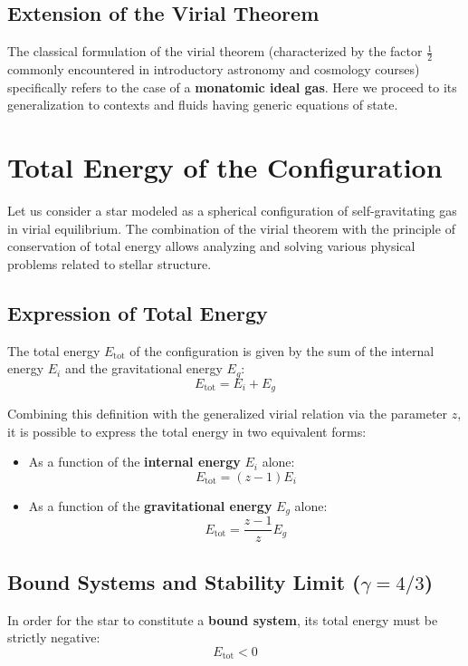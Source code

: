 \subsection{Extension of the Virial Theorem}
The classical formulation of the virial theorem (characterized by the factor $\frac{1}{2}$ commonly encountered in introductory astronomy and cosmology courses) specifically refers to the case of a \textbf{monatomic ideal gas}. Here we proceed to its generalization to contexts and fluids having generic equations of state.

\section{Total Energy of the Configuration}

Let us consider a star modeled as a spherical configuration of self-gravitating gas in virial equilibrium. The combination of the virial theorem with the principle of conservation of total energy allows analyzing and solving various physical problems related to stellar structure.

\subsection{Expression of Total Energy}
The total energy $E_{\text{tot}}$ of the configuration is given by the sum of the internal energy $E_i$ and the gravitational energy $E_g$:
\begin{equation}
E_{\text{tot}} = E_i + E_g
\end{equation}

Combining this definition with the generalized virial relation via the parameter $z$, it is possible to express the total energy in two equivalent forms:
\begin{itemize}
\item As a function of the \textbf{internal energy} $E_i$ alone:
\begin{equation}
E_{\text{tot}} = (z - 1) E_i
\end{equation}
\item As a function of the \textbf{gravitational energy} $E_g$ alone:
\begin{equation}
E_{\text{tot}} = \frac{z - 1}{z} E_g
\end{equation}
\end{itemize}

\subsection{Bound Systems and Stability Limit ($\gamma = 4/3$)}
In order for the star to constitute a \textbf{bound system}, its total energy must be strictly negative:
\begin{equation}
E_{\text{tot}} < 0
\end{equation}

